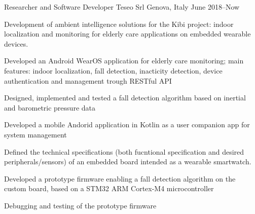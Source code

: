 

\begin{cventries}

  \cventry
    {Researcher and Software Developer} %
    {Teseo Srl} %
    {Genova, Italy} %
    {June 2018--Now} %
    {
      Development of ambient intelligence solutions for the Kibi project: indoor localization and monitoring for elderly care applications on embedded wearable devices.
      \vspace*{16pt}
      \begin{cvitems} %
        \item {Developed an Android WearOS application for elderly care monitoring; main features: indoor localization, fall detection, inacticity detection, device authentication and management trough RESTful API}
        \item {Designed, implemented and tested a fall detection algorithm based on inertial and barometric pressure data}
        \item {Developed a mobile Andorid application in Kotlin as a user companion app for system management}
        \item {Defined the technical specifications (both fucntional specification and desired peripherals/sensors) of an embedded board intended as a wearable smartwatch.}
        \item {
          Developed a prototype firmware enabling a fall detection algorithm on the custom board, based on a STM32 ARM Cortex-M4 microcontroller
        }
        \item{Debugging and testing of the prototype firmware}
      \end{cvitems}
    }


\end{cventries}
